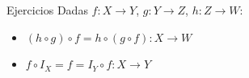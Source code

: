\documentclass[14pt,aspectratio=169,xcolor=dvipsnames]{beamer}
\begin{document}
\begin{frame}{Ejercicios}
    Dadas $f:X\to Y$, $g:Y\to Z$, $h:Z\to W$:
    \begin{itemize}
        \item $(h\circ g)\circ f = h\circ (g\circ f):X \to W$
        \item $f\circ I_X = f = I_Y\circ f: X\to Y$
    \end{itemize}
\end{frame}
\begin{frame}
    \maketitle
\end{frame}
\end{document}
